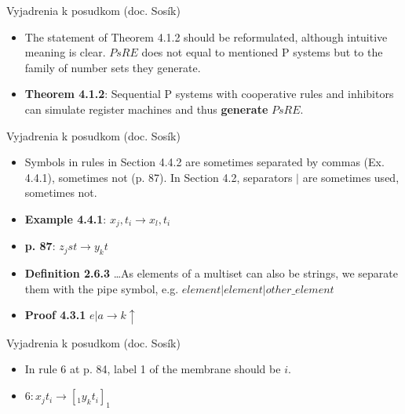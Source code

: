 \begin{frame}[t]{Vyjadrenia k posudkom (doc. Sosík)}
  \begin{itemize}
    \item The statement of Theorem 4.1.2 should be reformulated, although intuitive meaning is clear. $PsRE$ does not equal to mentioned P systems but to the family of number sets they generate.
    \item {\bf Theorem 4.1.2}: Sequential P systems with cooperative rules and inhibitors can simulate register machines and thus {\bf generate} $PsRE$.
  \end{itemize}
\end{frame}

\begin{frame}[t]{Vyjadrenia k posudkom (doc. Sosík)}
  \begin{itemize}
    \item Symbols in rules in Section 4.4.2 are sometimes separated by commas (Ex. 4.4.1), sometimes not (p. 87). In Section 4.2, separators $|$ are sometimes used, sometimes not.
    \pause
    \item {\bf Example 4.4.1}: $x_j,t_i\rightarrow x_l,t_i$
    \item {\bf p. 87}: $z_jst\rightarrow y_kt$
    \item {\bf Definition 2.6.3} \dots As elements of a multiset can also be strings, we separate them with the pipe symbol, e.g. $element|element|other\_element$
    \item {\bf Proof 4.3.1} $e|a\rightarrow k\uparrow$
  \end{itemize}
\end{frame}

\begin{frame}[t]{Vyjadrenia k posudkom (doc. Sosík)}
  \begin{itemize}
    \item In rule 6 at p. 84, label 1 of the membrane should be $i$.
    \item $6: x_jt_i\rightarrow [_1 y_kt_i]_1$
  \end{itemize}
\end{frame}

